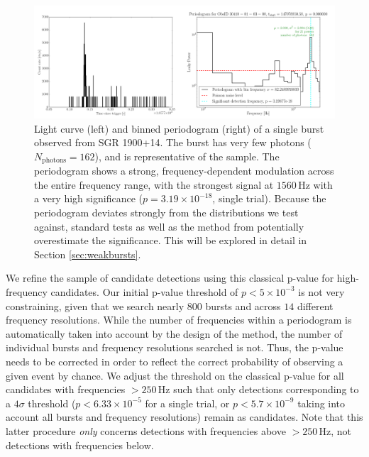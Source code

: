 \documentclass[numberedappendix]{emulateapj}
\newcommand{\hz}{\,\mathrm{Hz}}
\begin{document}
\begin{figure}[htbp]
\begin{center}
\includegraphics[width=18cm]{sgr1900_burst_example.png}
\caption{Light curve (left) and binned periodogram (right) of a single burst observed from SGR 1900+14. The burst has very few photons ($N_{\mathrm{photons}} = 162$), and is representative of the sample. The periodogram shows a strong, frequency-dependent modulation across the entire frequency range, with the strongest signal at $1560\hz$ with a very high significance ($p = 3.19 \times 10^{-18}$, single trial). Because the periodogram deviates strongly from the distributions we test against, standard tests as well as the method from \citet{huppenkothen2013} potentially overestimate the significance. This will be explored in detail in Section \ref{sec:weakbursts}.}
\label{fig:psd_individual_example}
\end{center}
\end{figure}

We refine the sample of candidate detections using this classical p-value for high-frequency candidates. Our initial p-value threshold of $p < 5 \times 10^{-3}$ is not very constraining, given that we search nearly $800$ bursts and 
across $14$ different frequency resolutions. While the number of frequencies within a periodogram is automatically taken into account by the design of the method, the number of individual bursts and frequency resolutions
searched is not. Thus, the p-value needs to be corrected in order to reflect the correct probability of observing a given event by chance. We adjust the threshold on the classical p-value for all candidates with frequencies
$> 250 \hz$ such that only detections corresponding to a $4\sigma$ threshold ($p < 6.33 \times 10^{-5}$ for a single trial, or $p < 5.7 \times 10^{-9}$ taking into account all bursts and frequency resolutions) remain
as candidates. Note that this latter procedure {\it only} concerns detections with frequencies above $> 250 \hz$, not detections with frequencies below.
\end{document}
